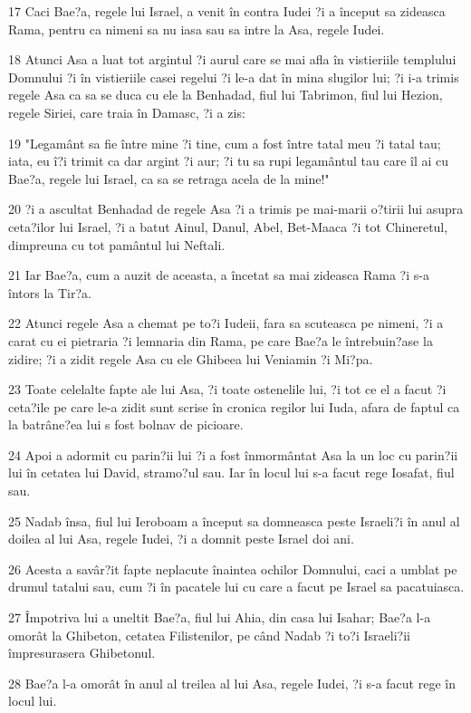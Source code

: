\par 17 Caci Bae?a, regele lui Israel, a venit în contra Iudei ?i a început sa zideasca Rama, pentru ca nimeni sa nu iasa sau sa intre la Asa, regele Iudei.
\par 18 Atunci Asa a luat tot argintul ?i aurul care se mai afla în vistieriile templului Domnului ?i în vistieriile casei regelui ?i le-a dat în mina slugilor lui; ?i i-a trimis regele Asa ca sa se duca cu ele la Benhadad, fiul lui Tabrimon, fiul lui Hezion, regele Siriei, care traia în Damasc, ?i a zis:
\par 19 "Legamânt sa fie între mine ?i tine, cum a fost între tatal meu ?i tatal tau; iata, eu î?i trimit ca dar argint ?i aur; ?i tu sa rupi legamântul tau care îl ai cu Bae?a, regele lui Israel, ca sa se retraga acela de la mine!"
\par 20 ?i a ascultat Benhadad de regele Asa ?i a trimis pe mai-marii o?tirii lui asupra ceta?ilor lui Israel, ?i a batut Ainul, Danul, Abel, Bet-Maaca ?i tot Chineretul, dimpreuna cu tot pamântul lui Neftali.
\par 21 Iar Bae?a, cum a auzit de aceasta, a încetat sa mai zideasca Rama ?i s-a întors la Tir?a.
\par 22 Atunci regele Asa a chemat pe to?i Iudeii, fara sa scuteasca pe nimeni, ?i a carat cu ei pietraria ?i lemnaria din Rama, pe care Bae?a le întrebuin?ase la zidire; ?i a zidit regele Asa cu ele Ghibeea lui Veniamin ?i Mi?pa.
\par 23 Toate celelalte fapte ale lui Asa, ?i toate ostenelile lui, ?i tot ce el a facut ?i ceta?ile pe care le-a zidit sunt scrise în cronica regilor lui Iuda, afara de faptul ca la batrâne?ea lui s fost bolnav de picioare.
\par 24 Apoi a adormit cu parin?ii lui ?i a fost înmormântat Asa la un loc cu parin?ii lui în cetatea lui David, stramo?ul sau. Iar în locul lui s-a facut rege Iosafat, fiul sau.
\par 25 Nadab însa, fiul lui Ieroboam a început sa domneasca peste Israeli?i în anul al doilea al lui Asa, regele Iudei, ?i a domnit peste Israel doi ani.
\par 26 Acesta a savâr?it fapte neplacute înaintea ochilor Domnului, caci a umblat pe drumul tatalui sau, cum ?i în pacatele lui cu care a facut pe Israel sa pacatuiasca.
\par 27 Împotriva lui a uneltit Bae?a, fiul lui Ahia, din casa lui Isahar; Bae?a l-a omorât la Ghibeton, cetatea Filistenilor, pe când Nadab ?i to?i Israeli?ii împresurasera Ghibetonul.
\par 28 Bae?a l-a omorât în anul al treilea al lui Asa, regele Iudei, ?i s-a facut rege în locul lui.
